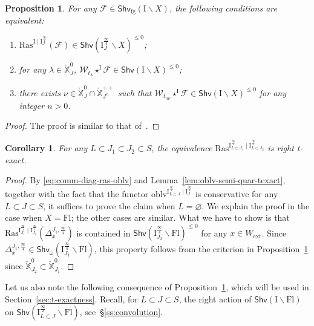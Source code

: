 \documentclass[11pt]{amsart}
\numberwithin{equation}{section}
\theoremstyle{plain}
\newtheorem{corollary}[thm]{Corollary}
\newtheorem{prop}[thm]{Proposition}
\theoremstyle{definition}
\newcommand{\F}{{\mathbb F}}
\newcommand{\sF}{{\mathcal F}}
\newcommand{\I}{{\mathrm I}}
\newcommand{\K}{{\mathbb K}}
\newcommand{\sL}{{\mathcal L}}
\newcommand{\sW}{{\mathcal W}}
\newcommand{\X}{{\mathbb X}}
\newcommand{\Xd}{\check{\X}}
\newcommand{\semi}{{{\frac{\infty}{2}}}}
\newcommand{\quar}{{{\frac{\infty}{4}}}}
\newcommand{\oblv}{\mathrm{oblv}}
\newcommand{\ex}{\mathrm{ext}}
\newcommand{\Shv}{\mathsf{Shv}}
\newcommand{\Shvfg}{\mathsf{Shv}_{\mathrm{fg}}}
\newcommand{\Ras}{\mathrm{Ras}}
\newcommand{\Fl}{\mathrm{Fl}}
\newcommand{\tFl}{\widetilde{\Fl}}
\newcommand{\Iu}{\mathrm{I}_{\mathrm{u}}}
\newcommand{\comp}{\mathrm{c}}
\begin{document}
\begin{prop}
\label{prop:tstr-convolution-Wak}
For any $\sF\in \Shvfg(\I\backslash X)$, the following conditions are equivalent:
\begin{enumerate}
\item 
$\Ras^{\I\mid \I_J^{\quar}}(\sF) \in \Shv\left(\I^{\quar}_J\backslash X\right)^{\leq 0}$; 
\item 
for any $\lambda\in \Xd_J^0$,
$\sW_{t_\lambda}\star^\I \sF\in \Shv(\I\backslash X)^{\leq 0}$; 
\item there exists $\nu\in \Xd_J^0 \cap\Xd^{++}_{J^\comp}$ such that $\sW_{t_{n\nu}} \star^\I \sF\in \Shv(\I\backslash X)^{\leq 0}$ for any integer $n >0$.
\end{enumerate}
\end{prop}

\begin{proof}
The proof is similar to that of~\cite[Lemma~6.11]{adr}. 
\end{proof}

\begin{corollary}
\label{cor:Ras-right-texact}
For any $L\subset J_1\subset J_2\subset S$, the equivalence $\Ras^{\I_{L\subset J_1}^{\semi}\mid \I_{L\subset J_2}^{\semi}}$ is right t-exact. 
\end{corollary}

\begin{proof}
By \eqref{eq:comm-diag-ras-oblv} and Lemma~\ref{lem:oblv-semi-quar-texact}, together with the fact that the functor $\oblv^{\I^\semi_{L\subset J}\mid \I^\quar_J}$ is conservative for any $L\subset J \subset S$, it suffices to prove the claim when $L=\varnothing$. 
We explain the proof in the case when $X=\Fl$; the other cases are similar. 
What we have to show is that $\Ras^{\I_{J_1}^{\quar}\mid \I_{J_2}^{\quar}}(\Delta^{J_1,\quar}_x)$ is contained in $\Shv \left( \I_{J_2}^{\quar}\backslash \Fl \right)^{\leq 0}$ for any $x\in W_\ex$. 
Since $\Delta^{J_1,\quar}_x\in \Shv_{\omega} \left( \I_{J_1}^{\quar}\backslash \Fl \right)$, this property follows from the criterion in Proposition~\ref{prop:tstr-convolution-Wak} since $\Xd_{J_2}^0\subset \Xd_{J_1}^0$.
\end{proof}

Let us also note the following consequence of Proposition~\ref{prop:tstr-convolution-Wak}, which will be used in Section~\ref{sec:t-exactness}. Recall, for $L \subset J \subset S$, the right action of $\Shv(\I \backslash \Fl)$ on $\Shv(\I_{L \subset J}^{\semi} \backslash \Fl)$, see~\S\ref{ss:convolution}.
\end{document}
